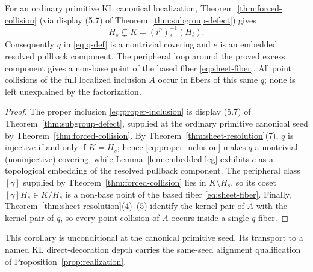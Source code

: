 \begin{corollary}\label{cor:forced-collision-meaning}
For an ordinary primitive KL canonical localization,
Theorem~\ref{thm:forced-collision} (via display (5.7) of
Theorem~\ref{thm:subgroup-defect}) gives
\begin{equation}\label{eq:proper-inclusion}
  H_s\subsetneq K=(i^{p})_*^{-1}(H_t).
\end{equation}
Consequently \( q \) in \eqref{eq:q-def} is a nontrivial covering and \( e \) is an embedded resolved pullback component.  The peripheral loop around the proved excess component gives a non-base point of the based fiber \eqref{eq:sheet-fiber}.  All point collisions of the full localized inclusion \( A \) occur in fibers of this same \( q \); none is left unexplained by the factorization.
\end{corollary}

\begin{proof}
The proper inclusion \eqref{eq:proper-inclusion} is display (5.7) of Theorem~\ref{thm:subgroup-defect}, supplied at the ordinary primitive canonical seed by Theorem~\ref{thm:forced-collision}.  By Theorem~\ref{thm:sheet-resolution}(7), \( q \) is injective if and only if \( K=H_s \); hence \eqref{eq:proper-inclusion} makes \( q \) a nontrivial (noninjective) covering, while Lemma~\ref{lem:embedded-leg} exhibits \( e \) as a topological embedding of the resolved pullback component.  The peripheral class \( [\gamma] \) supplied by Theorem~\ref{thm:forced-collision} lies in \( K\setminus H_s \), so its coset \( [\gamma]H_s\in K/H_s \) is a non-base point of the based fiber \eqref{eq:sheet-fiber}.  Finally, Theorem~\ref{thm:sheet-resolution}(4)--(5) identify the kernel pair of \( A \) with the kernel pair of \( q \), so every point collision of \( A \) occurs inside a single \( q \)-fiber.
\end{proof}

\begin{remark}
This corollary is unconditional at the canonical primitive seed.  Its
transport to a named KL direct-decoration depth carries the same-seed
alignment qualification of Proposition~\ref{prop:realization}.
\end{remark}
